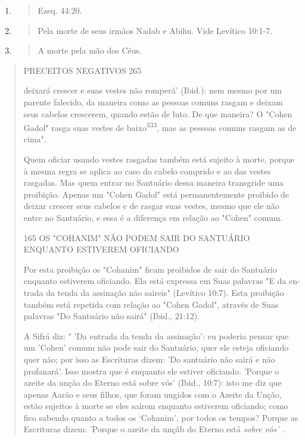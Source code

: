 \begin{enumerate}
\def\labelenumi{\arabic{enumi}.}
\setcounter{enumi}{329}
\item
  \begin{quote}
  Ezeq. 44:20.
  \end{quote}
\item
  \begin{quote}
  Pela morte de seus irmãos Nadab e Abihu. Vide Levítico 10:1-7.
  \end{quote}
\item
  \begin{quote}
  A morte pela mão dos Céus.
  \end{quote}
\end{enumerate}

\begin{quote}
PRECEITOS NEGATIVOS 265

deixará crescer e suas vestes não romperá' (Ibid.): nem mesmo por um
parente falecido, da maneira como as pessoas comuns rasgam e deixam seus
cabelos crescerem, quando estão de luto. De que maneira? O "Cohen Gadol"
rasga suas vestes de baixo\textsuperscript{333}, mas as pessoas comuns
rasgam as de cima".

Quem oficiar usando vestes rasgadas também está sujeito à morte, porque
à mesma regra se aplica ao caso do cabelo comprido e ao das vestes
rasgadas. Mas quem entrar no Santuário dessa maneira transgride uma
proibi­ção. Apenas um "Cohen Gadol" está permanentemente proibido de
deixar cres­cer seus cabelos e de rasgar suas vestes, mesmo que ele não
entre no Santuário, e essa é a diferença em relação ao "Cohen" comum.

165 OS "COHANIM" NÃO PODEM SAIR DO SANTUÁRIO ENQUANTO ESTIVEREM
OFICIANDO

Por esta proibição os "Cohanim" ficam proibidos de sair do Santuá­rio
enquanto estiverem oficiando. Ela está expressa em Suas palavras "E da
en­trada da tenda da assinação não saireis" (Levítico 10:7). Esta
proibição também está repetida com relação ao "Cohen Gadol", através de
Suas palavras "Do San­tuário não sairá" (Ibid., 21:12).

A Sifrá diz: " 'Da entrada da tenda da assinação': eu poderia pensar que
um 'Cohen' comum não pode sair do Santuário, quer ele esteja oficiando
quer não; por isso as Escrituras dizem: 'Do santuário não sairá e não
profanará'. Isso mostra que é enquanto ele estiver oficiando. 'Porque o
azeite da unção do Eterno está sobre vós' (Ibid., 10:7): isto me diz que
apenas Aarão e seus fi­lhos, que foram ungidos com o Azeite da Unção,
estão sujeitos à morte se eles saírem enquanto estiverem oficiando; como
fico sabendo quanto a todos os `Cohanim', por todos os tempos? Porque as
Escrituras dizem: 'Porque o azeite da unçãb do Eterno está \emph{sobre
vós' .}


\end{quote}

